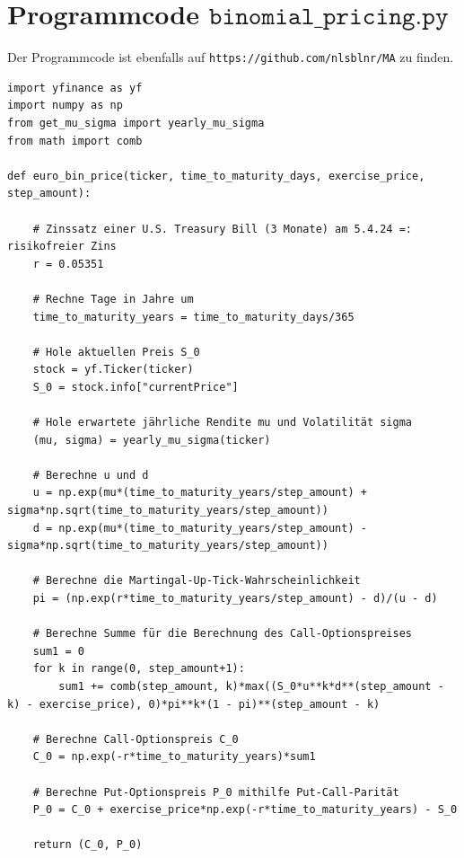 \documentclass[11pt]{report} %
\begin{document}
\section{Programmcode $\texttt{binomial\_pricing.py}$}
Der Programmcode ist ebenfalls auf \texttt{https://github.com/nlsblnr/MA} zu finden.
\label{code:binomial_pricing.py}
\begin{lstlisting}
import yfinance as yf
import numpy as np
from get_mu_sigma import yearly_mu_sigma
from math import comb

def euro_bin_price(ticker, time_to_maturity_days, exercise_price, step_amount):

    # Zinssatz einer U.S. Treasury Bill (3 Monate) am 5.4.24 =: risikofreier Zins
    r = 0.05351

    # Rechne Tage in Jahre um
    time_to_maturity_years = time_to_maturity_days/365

    # Hole aktuellen Preis S_0
    stock = yf.Ticker(ticker)
    S_0 = stock.info["currentPrice"]

    # Hole erwartete jährliche Rendite mu und Volatilität sigma
    (mu, sigma) = yearly_mu_sigma(ticker)

    # Berechne u und d
    u = np.exp(mu*(time_to_maturity_years/step_amount) + sigma*np.sqrt(time_to_maturity_years/step_amount))
    d = np.exp(mu*(time_to_maturity_years/step_amount) - sigma*np.sqrt(time_to_maturity_years/step_amount))

    # Berechne die Martingal-Up-Tick-Wahrscheinlichkeit
    pi = (np.exp(r*time_to_maturity_years/step_amount) - d)/(u - d)

    # Berechne Summe für die Berechnung des Call-Optionspreises
    sum1 = 0
    for k in range(0, step_amount+1):
        sum1 += comb(step_amount, k)*max((S_0*u**k*d**(step_amount - k) - exercise_price), 0)*pi**k*(1 - pi)**(step_amount - k)
    
    # Berechne Call-Optionspreis C_0
    C_0 = np.exp(-r*time_to_maturity_years)*sum1

    # Berechne Put-Optionspreis P_0 mithilfe Put-Call-Parität
    P_0 = C_0 + exercise_price*np.exp(-r*time_to_maturity_years) - S_0

    return (C_0, P_0)
\end{lstlisting}
\end{document}
